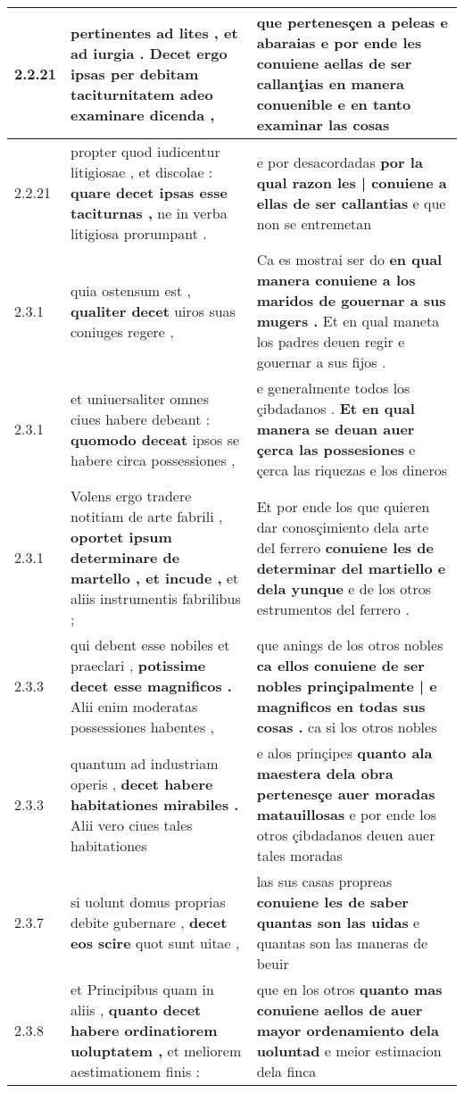 \begin{tabular}{|p{1cm}|p{6.5cm}|p{6.5cm}|}
2.2.21 & pertinentes ad lites , et ad iurgia . \textbf{ Decet ergo ipsas } per debitam taciturnitatem adeo examinare dicenda , & que pertenesçen a peleas e abaraias \textbf{ e por ende les conuiene aellas de ser callanţias en manera conuenible } e en tanto examinar las cosas \\\hline
2.2.21 & propter quod iudicentur litigiosae , et discolae : \textbf{ quare decet ipsas esse taciturnas , } ne in verba litigiosa prorumpant . & e por desacordadas \textbf{ por la qual razon les | conuiene a ellas de ser callantias } e que non se entremetan \\\hline
2.3.1 & quia ostensum est , \textbf{ qualiter decet } uiros suas coniuges regere , & Ca es mostrai ser do \textbf{ en qual manera conuiene a los maridos de gouernar a sus mugers . } Et en qual maneta los padres deuen regir e gouernar a sus fijos . \\\hline
2.3.1 & et uniuersaliter omnes ciues habere debeant : \textbf{ quomodo deceat } ipsos se habere circa possessiones , & e generalmente todos los çibdadanos . \textbf{ Et en qual manera se deuan auer çerca las possesiones } e çerca las riquezas e los dineros \\\hline
2.3.1 & Volens ergo tradere notitiam de arte fabrili , \textbf{ oportet ipsum determinare de martello , et incude , } et aliis instrumentis fabrilibus ; & Et por ende los que quieren dar conosçimiento dela arte del ferrero \textbf{ conuiene les de determinar del martiello e dela yunque } e de los otros estrumentos del ferrero . \\\hline
2.3.3 & qui debent esse nobiles et praeclari , \textbf{ potissime decet esse magnificos . } Alii enim moderatas possessiones habentes , & que anings de los otros nobles \textbf{ ca ellos conuiene de ser nobles prinçipalmente | e magnificos en todas sus cosas . } ca si los otros nobles \\\hline
2.3.3 & quantum ad industriam operis , \textbf{ decet habere habitationes mirabiles . } Alii vero ciues tales habitationes & e alos prinçipes \textbf{ quanto ala maestera dela obra pertenesçe auer moradas matauillosas } e por ende los otros çibdadanos deuen auer tales moradas \\\hline
2.3.7 & si uolunt domus proprias debite gubernare , \textbf{ decet eos scire } quot sunt uitae , & las sus casas propreas \textbf{ conuiene les de saber quantas son las uidas } e quantas son las maneras de beuir \\\hline
2.3.8 & et Principibus quam in aliis , \textbf{ quanto decet habere ordinatiorem uoluptatem , } et meliorem aestimationem finis : & que en los otros \textbf{ quanto mas conuiene aellos de auer mayor ordenamiento dela uoluntad } e meior estimacion dela finca \\\hline

\end{tabular}
